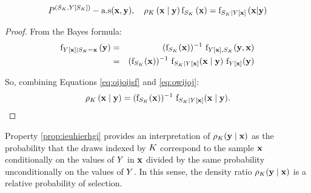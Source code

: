\begin{property}\label{prop:ieuhierhgi}
\begin{equation}
P^{(S_K,Y[S_K])}-\text{a.s}(\mathbf{x},\mathbf{y}),~~~
\rho_{K}\left(\mathbf{x} \mid \mathbf{y}\right)
         \mathrm{f}_{S_K}\left(\mathbf{x}\right)=
    \mathrm{f}_{S_K\mid Y[\mathbf{x}]}\left(\mathbf{x}|\mathbf{y}\right)
\end{equation}


\end{property}

\begin{proof}
From the Bayes formula:
\begin{eqnarray}
\mathrm{f}_{Y[\mathbf{x}]\mid S_K =\mathbf{x} }\left(\mathbf{y}\right)
&=&(\mathrm{f}_{S_K }(\mathbf{x}))^{-1}~\mathrm{f}_{Y[\mathbf{x}],S_K }(\mathbf{y},\mathbf{x})\\
&=&(\mathrm{f}_{S_K }(\mathbf{x}))^{-1}~
\mathrm{f}_{S_K \mid Y[\mathbf{x}]}(\mathbf{x}\mid \mathbf{y})~
\mathrm{f}_{Y[\mathbf{x}]}(\mathbf{y})\label{eq:oijoijsf}
\end{eqnarray}


So, combining Equations \eqref{eq:oijoijsf} and  \eqref{eq:owijoj}:
\begin{equation}
{\rho_{K}\left(\mathbf{x}\mid \mathbf{y}\right)}
=(\mathrm{f}_{S_K }(\mathbf{x}))^{-1}
~\mathrm{f}_{S_K \mid Y[\mathbf{x}]}(\mathbf{x}\mid \mathbf{y}).
\end{equation}
\end{proof}%

Property \ref{prop:ieuhierhgi} provides an interpretation of $\rho_K(\mathbf{y}\mid \mathbf{x})$ as the probability that the draws indexed by $K$ correspond to the sample $\mathbf{x}$ conditionally on the values of $Y$ in $\mathbf{x}$ divided by the same probability unconditionally on the values of $Y$. 
In this sense, the density ratio $\rho_K(\mathbf{y}\mid \mathbf{x})$ is a relative probability of selection.




